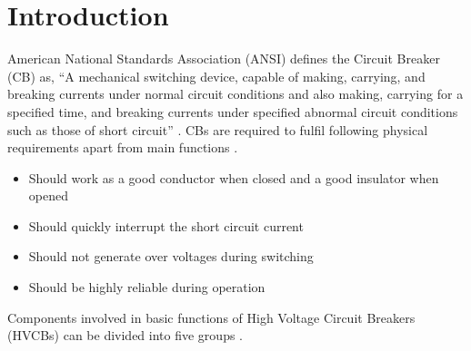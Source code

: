 
\section{Introduction}
American National Standards Association (ANSI) defines the Circuit Breaker (CB) as, \textquotedblleft A mechanical switching device, capable of making, carrying, and breaking currents under normal circuit conditions and also making, carrying for a specified time, and breaking currents under specified abnormal circuit conditions such as those of short circuit\textquotedblright
 \cite{DefinitionforPower}. CBs are required to fulfil following physical requirements apart from main functions \cite{van2001transients}.

\begin{itemize}
\item Should work as a good conductor when closed and a good insulator when opened
\item Should quickly interrupt the short circuit current
\item Should not generate over voltages during switching
\item Should be highly reliable during operation
\end{itemize}

Components involved in basic functions of High Voltage Circuit Breakers (HVCBs) can be divided into five groups \cite{cigre2000user}.

